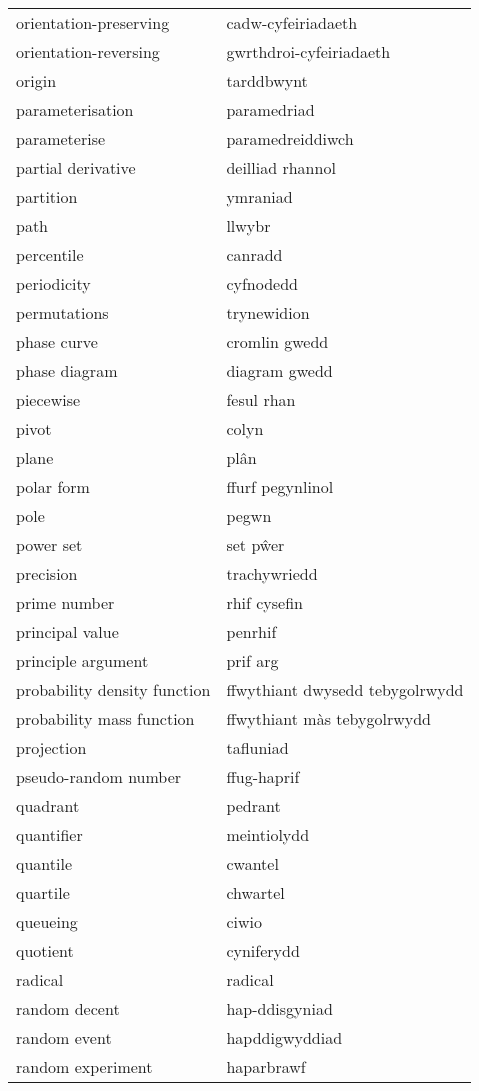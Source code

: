 \begin{supertabular}{p{0.22\textwidth}p{0.22\textwidth}}
orientation-preserving & cadw-cyfeiriadaeth \\
orientation-reversing & gwrthdroi-cyfeiriadaeth \\
origin & tarddbwynt \\
parameterisation & paramedriad \\
parameterise & paramedreiddiwch \\
partial derivative & deilliad rhannol \\
partition & ymraniad \\
path & llwybr \\
percentile & canradd \\
periodicity & cyfnodedd \\
permutations & trynewidion \\
phase curve & cromlin gwedd \\
phase diagram & diagram gwedd \\
piecewise & fesul rhan \\
pivot & colyn \\
plane & plân \\
polar form & ffurf pegynlinol \\
pole & pegwn \\
power set & set pŵer \\
precision & trachywriedd \\
prime number & rhif cysefin \\
principal value & penrhif \\
principle argument & prif arg \\
probability density function & ffwythiant dwysedd tebygolrwydd \\
probability mass function & ffwythiant màs tebygolrwydd \\
projection & tafluniad \\
pseudo-random number & ffug-haprif \\
quadrant & pedrant \\
quantifier & meintiolydd \\
quantile & cwantel \\
quartile & chwartel \\
queueing & ciwio \\
quotient & cyniferydd \\
radical & radical \\
random decent & hap-ddisgyniad \\
random event & hapddigwyddiad \\
random experiment & haparbrawf \\

\end{supertabular}

